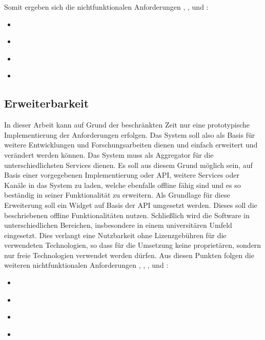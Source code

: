 Somit ergeben sich die nichtfunktionalen Anforderungen , ,  und : 
\begin{itemize}
 \item \requirement{\requirementAggregator}\label{requirementAggregator}
 \item \requirement{\requirementWidgetStandard}\label{requirementWidgetStandard}
 \item \requirement{\requirementUsbStick}\label{requirementUsbStick}
 \item \requirement{\requirementUsageInBrowser}\label{requirementUsageInBrowser}
\end{itemize}

\subsection{Erweiterbarkeit}
In dieser Arbeit kann auf Grund der beschränkten Zeit nur eine prototypische Implementierung der Anforderungen erfolgen. Das System soll also als Basis für weitere Entwicklungen und Forschungsarbeiten dienen und einfach erweitert und verändert werden können. Das System muss als Aggregator für die unterschiedlichsten Services dienen. Es soll aus diesem Grund möglich sein, auf Basis einer vorgegebenen Implementierung oder API, weitere Services oder Kanäle in das System zu laden, welche ebenfalls offline fähig sind und es so beständig in seiner Funktionalität zu erweitern. Als Grundlage für diese Erweiterung soll ein Widget auf Basis der API umgesetzt werden. Dieses soll die beschriebenen offline Funktionalitäten nutzen. Schließlich wird die Software in unterschiedlichen Bereichen, insbesondere in einem universitären Umfeld eingesetzt. Dies verlangt eine Nutzbarkeit ohne Lizenzgebühren für die verwendeten Technologien, so dass für die Umsetzung keine proprietären, sondern nur freie Technologien verwendet werden dürfen. Aus diesen Punkten folgen die weiteren nichtfunktionalen Anforderungen , , , und :
\begin{itemize}
 \item \requirement{\requirementNewWidgetsWithApi}\label{requirementNewWidgetsWithApi}
 \item \requirement{\requirementExampleWidget}\label{requirementExampleWidget}
 \item \requirement{\requirementExtensibility}\label{requirementExtensibility}
 \item \requirement{\requirementOpenSource}\label{requirementOpenSource}
\end{itemize}

